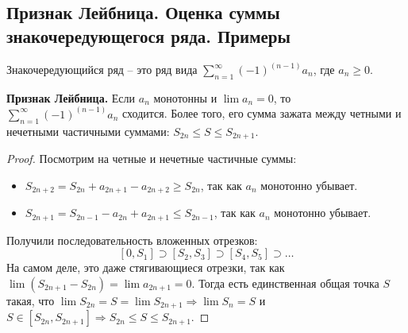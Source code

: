 \subsection{Признак Лейбница. Оценка суммы знакочередующегося ряда. Примеры}
\begin{conj}
    Знакочередующийся ряд -- это ряд вида $\sum\limits_{n=1}^\infty (-1)^{(n-1)}a_n$, где $a_n \geqslant 0$.
\end{conj}

\textbf{Признак Лейбница.} Если $a_n$ монотонны и $\lim a_n = 0$, то $\sum\limits_{n=1}^\infty (-1)^{(n-1)}a_n$ сходится.
Более того, его сумма зажата между четными и нечетными частичными суммами: $S_{2n} \leqslant S \leqslant S_{2n + 1}$.

\begin{proof}
    Посмотрим на четные и нечетные частичные суммы: \begin{itemize}
        \item $S_{2n + 2} = S_{2n} + a_{2n + 1} - a_{2n + 2} \geqslant  S_{2n}$, так как $a_n$ монотонно убывает.
        \item $S_{2n + 1} = S_{2n - 1} - a_{2n} + a_{2n + 1} \leqslant S_{2n - 1}$, так как $a_n$ монотонно убывает.
    \end{itemize}
    \quad Получили последовательность вложенных отрезков: \[ [0, S_1] \supset [S_2, S_3] \supset [S_4, S_5] \supset \dots \]
    \quad На самом деле, это даже стягивающиеся отрезки, так как $\lim (S_{2n+1} - S_{2n}) = \lim a_{2n+1} = 0$.
    Тогда есть единственная общая точка $S$ такая, что $\lim S_{2n} = S = \lim S_{2n+1} \Rightarrow \lim S_n = S$ и $S \in [S_{2n}, S_{2n+1}] \Rightarrow S_{2n} \leqslant S \leqslant S_{2n+1}$.
\end{proof}


